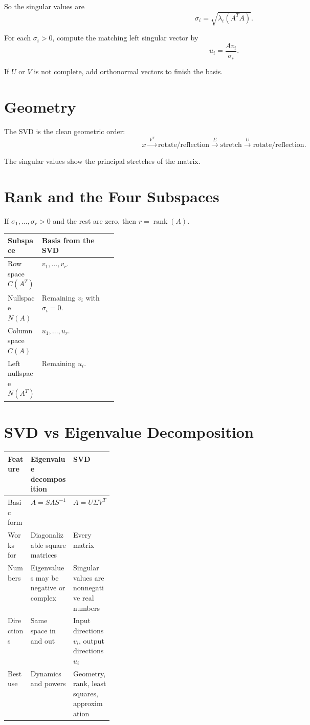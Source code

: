 \documentclass[10pt]{article}
\begin{document}
So the singular values are
\[
\sigma_i=\sqrt{\lambda_i(A^{T}A)}.
\]

For each \(\sigma_i>0\), compute the matching left singular vector by
\[
u_i=\frac{Av_i}{\sigma_i}.
\]

If \(U\) or \(V\) is not complete, add orthonormal vectors to finish the basis.

\section{Geometry}

The SVD is the clean geometric order:
\[
x
\xrightarrow{\;V^{T}\;}
\text{rotate/reflection}
\xrightarrow{\;\Sigma\;}
\text{stretch}
\xrightarrow{\;U\;}
\text{rotate/reflection}.
\]

The singular values show the principal stretches of the matrix.

\section{Rank and the Four Subspaces}

If \(\sigma_1,\ldots,\sigma_r>0\) and the rest are zero, then \(r=\operatorname{rank}(A)\).

\begin{center}
\small
\begin{tabularx}{\linewidth}{@{}L{0.25\linewidth}Y@{}}
\toprule
Subspace & Basis from the SVD \\
\midrule
Row space \(C(A^{T})\) & \(v_1,\ldots,v_r\). \\
Nullspace \(N(A)\) & Remaining \(v_i\) with \(\sigma_i=0\). \\
Column space \(C(A)\) & \(u_1,\ldots,u_r\). \\
Left nullspace \(N(A^{T})\) & Remaining \(u_i\). \\
\bottomrule
\end{tabularx}
\end{center}

\section{SVD vs Eigenvalue Decomposition}

\begin{center}
\small
\begin{tabularx}{\linewidth}{@{}L{0.24\linewidth}Y Y@{}}
\toprule
Feature & Eigenvalue decomposition & SVD \\
\midrule
Basic form & \(A=S\Lambda S^{-1}\) & \(A=U\Sigma V^{T}\) \\
Works for & Diagonalizable square matrices & Every matrix \\
Numbers & Eigenvalues may be negative or complex & Singular values are nonnegative real numbers \\
Directions & Same space in and out & Input directions \(v_i\), output directions \(u_i\) \\
Best use & Dynamics and powers & Geometry, rank, least squares, approximation \\
\bottomrule
\end{tabularx}
\end{center}
\end{document}
